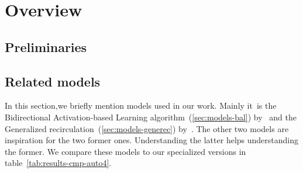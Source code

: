 



\section{Overview}
\label{sec:overview} 

\subsection{Preliminaries}
\label{sec:theory} 

 



\subsection{Related models}
\label{sec:overview-models}  

In this section,we briefly mention models used in our work. Mainly it~is the Bidirectional Activation-based Learning algorithm~(\ref{sec:models-bal}) by~\citet{farkas2013bal} and the Generalized recirculation~(\ref{sec:models-generec}) by~\citet{o1996bio}. The other two models are inspiration for the two former ones. Understanding the latter helps understanding the former. We compare these models to our specialized versions in table~\ref{tab:results-cmp-auto4}. 










 
